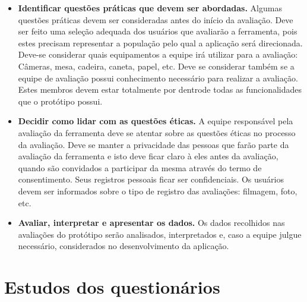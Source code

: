     \begin{itemize}
    
       \item \textbf{Identificar questões práticas que devem ser abordadas.}
       \subitem Algumas questões práticas devem ser consideradas antes do início da avaliação. Deve ser feito uma seleção adequada dos usuários 
       que avaliarão a ferramenta, pois estes precisam representar a população pelo qual a aplicação será direcionada. Deve-se considerar quais 
       equipamentos a equipe irá utilizar para a avaliação: Câmeras, mesa, cadeira, caneta, papel, etc. Deve se considerar também se a equipe
       de avaliação possui conhecimento necessário para realizar a avaliação. Estes membros devem estar totalmente por dentrode todas as 
       funcionalidades que o protótipo possui. 
       
    \end{itemize}
       
    \begin{itemize}
    
       \item \textbf{Decidir como lidar com as questões éticas.}
       \subitem A equipe responsável pela avaliação da ferramenta deve se atentar sobre as questões éticas no processo da avaliação. Deve se manter a 
       privacidade das pessoas que farão parte da avaliação da ferramenta e isto deve ficar claro à eles antes da avaliação, quando são convidados a 
       participar da mesma através do termo de consentimento. Seus registros pessoais ficar ser confidenciais. Os usuários devem ser informados sobre 
       o tipo de registro das avaliações: filmagem, foto, etc.
       
    \end{itemize}
       
    \begin{itemize}
    
       \item \textbf{Avaliar, interpretar e apresentar os dados.}
       \subitem Os dados recolhidos nas avaliações do protótipo serão analisados, interpretados e, caso a equipe julgue necessário,
	considerados no desenvolvimento da aplicação.
   
   \end{itemize}
  
  \vfill
  \pagebreak
  \section{Estudos dos questionários}
    
